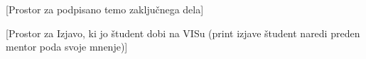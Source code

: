 %

\newpage

\mbox{}\thispagestyle{empty}
\newpage


\newpage


\thispagestyle{empty}
[Prostor za podpisano temo zaključnega dela]
\newpage

\pagestyle{fancy_nohead}

\newpage

\thispagestyle{empty}
[Prostor za Izjavo, ki jo študent dobi na VISu (print izjave študent naredi preden mentor poda svoje mnenje)]
\newpage


\newpage

 
